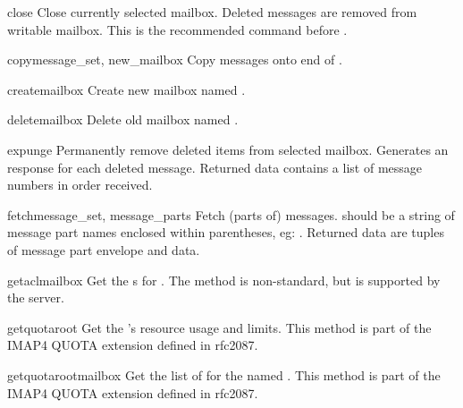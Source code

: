 \begin{methoddesc}{close}{}
  Close currently selected mailbox. Deleted messages are removed from
  writable mailbox. This is the recommended command before
  .
\end{methoddesc}

\begin{methoddesc}{copy}{message_set, new_mailbox}
  Copy  messages onto end of . 
\end{methoddesc}

\begin{methoddesc}{create}{mailbox}
  Create new mailbox named .
\end{methoddesc}

\begin{methoddesc}{delete}{mailbox}
  Delete old mailbox named .
\end{methoddesc}

\begin{methoddesc}{expunge}{}
  Permanently remove deleted items from selected mailbox. Generates an
   response for each deleted message. Returned data
  contains a list of  message numbers in order
  received.
\end{methoddesc}

\begin{methoddesc}{fetch}{message_set, message_parts}
  Fetch (parts of) messages.   should be
  a string of message part names enclosed within parentheses,
  eg: .  Returned data are tuples
  of message part envelope and data.
\end{methoddesc}

\begin{methoddesc}{getacl}{mailbox}
  Get the s for .
  The method is non-standard, but is supported by the  server.
\end{methoddesc}

\begin{methoddesc}{getquota}{root}
  Get the  's resource usage and limits.
  This method is part of the IMAP4 QUOTA extension defined in rfc2087.
\end{methoddesc}

\begin{methoddesc}{getquotaroot}{mailbox}
  Get the list of   for the named .
  This method is part of the IMAP4 QUOTA extension defined in rfc2087.
\end{methoddesc}

